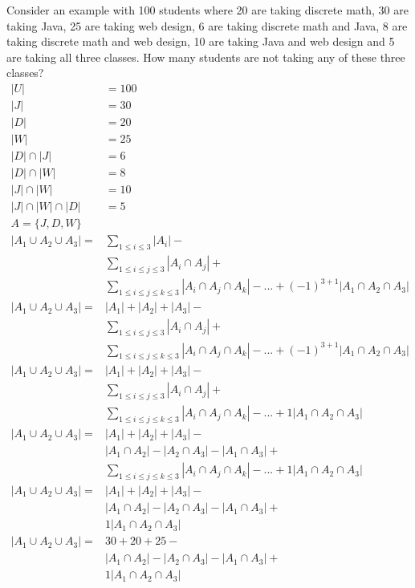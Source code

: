 \documentclass{article}
\begin{document}
Consider an example with 100 students where 20 are taking discrete math, 30 are taking Java, 25 are taking web design, 6 are taking discrete math and Java, 8 are taking discrete math and web design, 10 are taking Java and web design and 5 are taking all three classes. How many students are not taking any of these three classes?
\begin{align*}
|U|&= 100 \\
|J|&=30\\
|D|&=20\\
|W|&=25\\
|D|\cap|J|&=6\\
|D|\cap|W|&=8\\
|J|\cap|W|&=10\\
|J|\cap|W|\cap|D|&=5\\
A = \{J, D, W\}\\
|A_1 \cup A_2 \cup A_3| =  &\sum_{1\leq i \leq 3}|A_i|  - \\&\sum_{1\leq i \le j \leq 3}|A_i \cap A_j| + \\ & \sum_{1 \leq i \le j \le k \leq 3}|A_i \cap A_j \cap A_k| - ... + (-1)^{3+1}|A_1\cap A_2 \cap A_3| \\
|A_1 \cup A_2 \cup A_3| = & |A_1| + |A_2| + |A_3|   - \\&\sum_{1\leq i \le j \leq 3}|A_i \cap A_j| + \\ & \sum_{1 \leq i \le j \le k \leq 3}|A_i \cap A_j \cap A_k| - ... + (-1)^{3+1}|A_1\cap A_2 \cap A_3| \\
|A_1 \cup A_2 \cup A_3| = & |A_1| + |A_2| + |A_3|   - \\&\sum_{1\leq i \le j \leq 3}|A_i \cap A_j| + \\ & \sum_{1 \leq i \le j \le k \leq 3}|A_i \cap A_j \cap A_k| - ... + 1|A_1\cap A_2 \cap A_3| \\
|A_1 \cup A_2 \cup A_3| = & |A_1| + |A_2| + |A_3|    - \\& |A_1 \cap A_2| - |A_2 \cap A_3| - |A_1 \cap A_3| + \\ & \sum_{1 \leq i \le j \le k \leq 3}|A_i \cap A_j \cap A_k| - ... + 1|A_1\cap A_2 \cap A_3| \\
|A_1 \cup A_2 \cup A_3| = & |A_1| + |A_2| + |A_3|  - \\& |A_1 \cap A_2| - |A_2 \cap A_3| - |A_1 \cap A_3| + \\ & 1|A_1\cap A_2 \cap A_3| \\
|A_1 \cup A_2 \cup A_3| = & 30 + 20 + 25  - \\& |A_1 \cap A_2| - |A_2 \cap A_3| - |A_1 \cap A_3| + \\ & 1|A_1\cap A_2 \cap A_3| \\

\end{align*}
\end{document}
